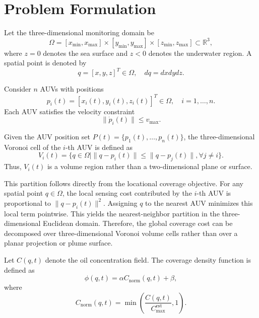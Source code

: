 \documentclass[conference]{IEEEtran}
\begin{document}
\section{Problem Formulation}
Let the three-dimensional monitoring domain be
\begin{equation}
\Omega=[x_{\min},x_{\max}]\times[y_{\min},y_{\max}]\times[z_{\min},z_{\max}]\subset\mathbb{R}^3,
\end{equation}
where $z=0$ denotes the sea surface and $z<0$ denotes the underwater region. A spatial point is denoted by
\begin{equation}
q=[x,y,z]^T\in\Omega,\quad dq=dxdydz.
\end{equation}

Consider $n$ AUVs with positions
\begin{equation}
p_i(t)=[x_i(t),y_i(t),z_i(t)]^T\in\Omega,\quad i=1,\ldots,n.
\end{equation}
Each AUV satisfies the velocity constraint
\begin{equation}
\|\dot p_i(t)\|\leq v_{\max}.
\end{equation}

Given the AUV position set $P(t)=\{p_1(t),\ldots,p_n(t)\}$, the three-dimensional Voronoi cell of the $i$-th AUV is defined as
\begin{equation}
V_i(t)=\{q\in\Omega\mid \|q-p_i(t)\|\leq \|q-p_j(t)\|,\forall j\neq i\}.
\end{equation}
Thus, $V_i(t)$ is a volume region rather than a two-dimensional plane or surface.

This partition follows directly from the locational coverage objective. For any spatial point $q\in\Omega$, the local sensing cost contributed by the $i$-th AUV is proportional to $\|q-p_i(t)\|^2$. Assigning $q$ to the nearest AUV minimizes this local term pointwise. This yields the nearest-neighbor partition in the three-dimensional Euclidean domain. Therefore, the global coverage cost can be decomposed over three-dimensional Voronoi volume cells rather than over a planar projection or plume surface.

Let $C(q,t)$ denote the oil concentration field. The coverage density function is defined as
\begin{equation}
\phi(q,t)=\alpha C_{\mathrm{norm}}(q,t)+\beta,
\end{equation}
where
\begin{equation}
C_{\mathrm{norm}}(q,t)=\min\left(\frac{C(q,t)}{C_{\max}^{\mathrm{est}}},1\right).
\end{equation}
\end{document}
